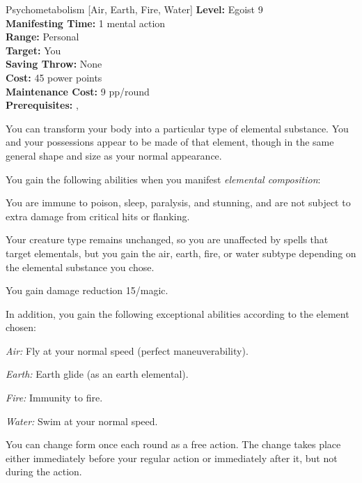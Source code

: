 {Psychometabolism [Air, Earth, Fire, Water]}
{
	\textbf{Level:}
	Egoist 9\\
	\textbf{Manifesting Time:}
	1 mental action\\
	\textbf{Range:}
	Personal\\
	\textbf{Target:}
	You\\
	\textbf{Saving Throw:}
	None\\
	\textbf{Cost:}
	45 power points\\
	\textbf{Maintenance Cost:}
	9 pp/round\\
	\textbf{Prerequisites:}
	, \\
}
{
	You can transform your body into a particular type of elemental substance. You and your possessions appear to be made of that element, though in the same general shape and size as your normal appearance.

	You gain the following abilities when you manifest \emph{elemental composition}:
	\begin{itemize*}
		\item You are immune to poison, sleep, paralysis, and stunning, and are not subject to extra damage from critical hits or flanking.
		\item Your creature type remains unchanged, so you are unaffected by spells that target elementals, but you gain the air, earth, fire, or water subtype depending on the elemental substance you chose.
		\item You gain damage reduction 15/magic.
	\end{itemize*}

	In addition, you gain the following exceptional abilities according to the element chosen:

	\textit{Air:} Fly at your normal speed (perfect maneuverability).

	\textit{Earth:} Earth glide (as an earth elemental).

	\textit{Fire:} Immunity to fire.

	\textit{Water:} Swim at your normal speed.

	You can change form once each round as a free action. The change takes place either immediately before your regular action or immediately after it, but not during the action. 
}